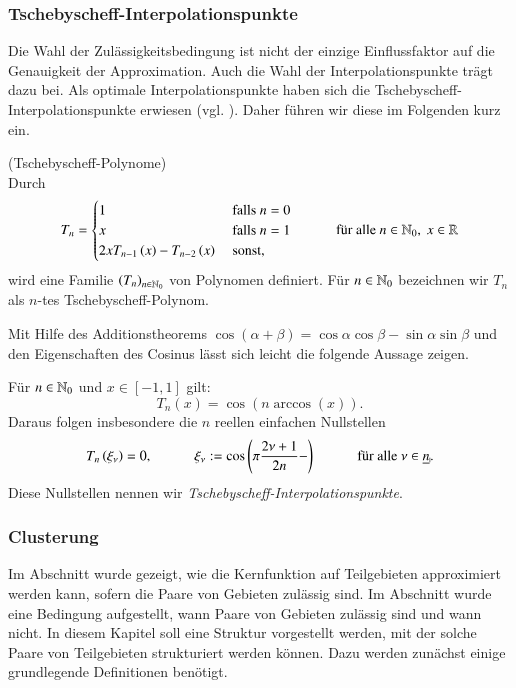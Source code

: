     \subsubsection{Tschebyscheff-Interpolationspunkte}
    \label{sec:tscheby}
      Die Wahl der Zulässigkeitsbedingung ist nicht der einzige Einflussfaktor auf die Genauigkeit der Approximation. Auch die Wahl der Interpolationspunkte trägt dazu bei.
      Als optimale Interpolationspunkte haben sich die Tschebyscheff-Interpolationspunkte erwiesen (vgl. \citet{nichtlokop}). Daher führen wir diese im Folgenden kurz ein.
      
      \begin{defn}
	(Tschebyscheff-Polynome)\\
	Durch
	\begin{equation*}
	  T_n = 
	  \begin{cases}
	    1  				& \text{ falls } n = 0\\
	    x				& \text{ falls } n = 1\\
	    2 x T_{n-1}\left(x\right) - T_{n-2}\left(x\right) & \text{ sonst,}
	  \end{cases}
	  \ \ \ \ \ \ \ \ \ \ \ \ \text{für alle } n \in \mathbb{N}_0, \ x \in \mathbb{R}
	\end{equation*}
	wird eine Familie $\left(T_n\right)_{n \in \mathbb{N}_0}$ von Polynomen definiert. Für $n \in \mathbb{N}_0$ bezeichnen wir $T_n$ als $n$-tes Tschebyscheff-Polynom.
	\citep{nichtlokop}
      \end{defn}
      
      Mit Hilfe des Additionstheorems $\cos \left(\alpha + \beta\right) = \cos \alpha \cos \beta - \sin \alpha \sin \beta$ und den Eigenschaften des Cosinus lässt sich leicht die folgende Aussage zeigen.
      
      \begin{lemdef}
	Für $n \in \mathbb{N}_0$ und $x \in [-1,1]$ gilt:
	\[
	  T_n\left(x\right) = \cos \left( n \arccos \left(x\right) \right).
	\]
	Daraus folgen insbesondere die $n$ reellen einfachen Nullstellen
	\[
	  T_n\left( \xi_\nu \right) = 0, \ \ \ \ \ \ \ \ \ \ \ \ \xi_\nu := \cos \left(\pi \frac{2\nu + 1}{2n} -\right) \ \ \ \ \ \ \ \ \ \ \ \ \text{für alle } \nu \in \haken{n}.
	\]
	Diese Nullstellen nennen wir \textit{Tschebyscheff-Interpolationspunkte}.
	\citep{nichtlokop}
      \end{lemdef}
      
    \subsubsection{Clusterung}
    \label{sec:cluster}
      Im Abschnitt  wurde gezeigt, wie die Kernfunktion auf Teilgebieten approximiert werden kann, sofern die Paare von Gebieten zulässig sind.
      Im Abschnitt  wurde eine Bedingung aufgestellt, wann Paare von Gebieten zulässig sind und wann nicht.
      In diesem Kapitel soll eine Struktur vorgestellt werden, mit der solche Paare von Teilgebieten strukturiert werden können.
      Dazu werden zunächst einige grundlegende Definitionen benötigt.
      
